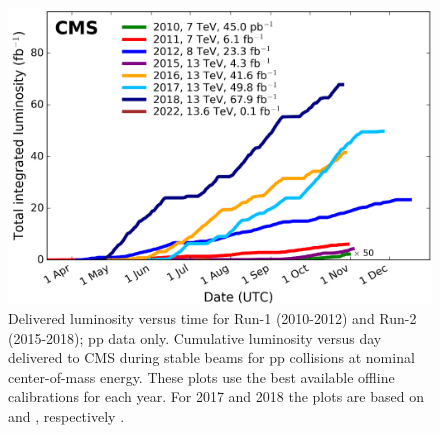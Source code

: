 \begin{center}
  \begin{figure}[h!]
    \centering
    \includegraphics[scale=.3]{Chapter1/int_lumi_per_year.png}
    \caption[CMS Luminosity per year]{Delivered luminosity versus time for Run-1 (2010-2012) and Run-2 (2015-2018); pp data only. Cumulative luminosity versus day delivered to CMS during stable beams for pp collisions at nominal center-of-mass energy. These plots use the best available offline calibrations for each year. For 2017 and  2018 the plots are based on \cite{pas_17} and \cite{pas_18}, respectively \cite{wikicern}.}
    \label{lumi_per_year_int}
  \end{figure}
\end{center}



